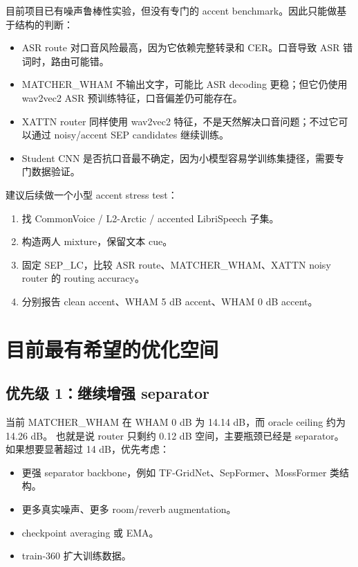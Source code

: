 \documentclass[UTF8,zihao=-4]{ctexart}
\begin{document}
目前项目已有噪声鲁棒性实验，但没有专门的 accent benchmark。因此只能做基于结构的判断：

\begin{itemize}
  \item ASR route 对口音风险最高，因为它依赖完整转录和 CER。口音导致 ASR 错词时，路由可能错。
  \item MATCHER\_WHAM 不输出文字，可能比 ASR decoding 更稳；但它仍使用 wav2vec2 ASR 预训练特征，口音偏差仍可能存在。
  \item XATTN router 同样使用 wav2vec2 特征，不是天然解决口音问题；不过它可以通过 noisy/accent SEP candidates 继续训练。
  \item Student CNN 是否抗口音最不确定，因为小模型容易学训练集捷径，需要专门数据验证。
\end{itemize}

建议后续做一个小型 accent stress test：
\begin{enumerate}
  \item 找 CommonVoice / L2-Arctic / accented LibriSpeech 子集。
  \item 构造两人 mixture，保留文本 cue。
  \item 固定 SEP\_LC，比较 ASR route、MATCHER\_WHAM、XATTN noisy router 的 routing accuracy。
  \item 分别报告 clean accent、WHAM 5 dB accent、WHAM 0 dB accent。
\end{enumerate}

\section{目前最有希望的优化空间}

\subsection{优先级 1：继续增强 separator}

当前 MATCHER\_WHAM 在 WHAM 0 dB 为 14.14 dB，而 oracle ceiling 约为 14.26 dB。
也就是说 router 只剩约 0.12 dB 空间，主要瓶颈已经是 separator。
如果想要显著超过 14 dB，优先考虑：
\begin{itemize}
  \item 更强 separator backbone，例如 TF-GridNet、SepFormer、MossFormer 类结构。
  \item 更多真实噪声、更多 room/reverb augmentation。
  \item checkpoint averaging 或 EMA。
  \item train-360 扩大训练数据。
\end{itemize}
\end{document}
